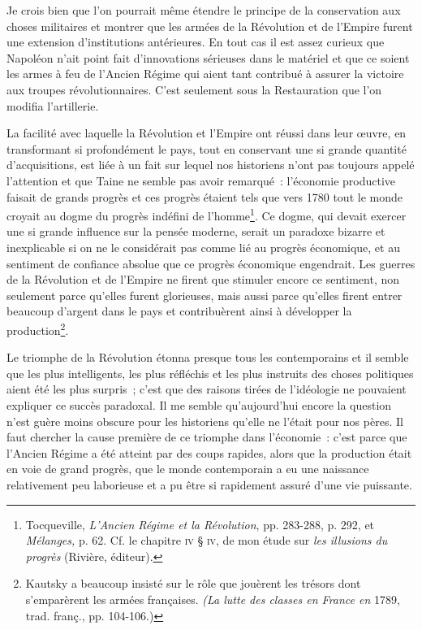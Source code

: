 \documentclass[french,twoside]{book} %
\begin{document}
 Je crois bien que l’on pourrait même étendre le principe de la conservation aux choses militaires et montrer que les armées de la Révolution et de l’Empire furent une extension d’institutions antérieures. En tout cas il est assez curieux que Napoléon n’ait point fait d’innovations sérieuses dans le matériel et que ce soient les armes à feu de l’Ancien Régime qui aient tant contribué à assurer la victoire aux troupes révolutionnaires. C’est seulement sous la Restauration que l’on modifia l’artillerie.\par
La facilité avec laquelle la Révolution et l’Empire ont réussi dans leur œuvre, en transformant si profondément le pays, tout en conservant une si grande quantité d’acquisitions, est liée à un fait sur lequel nos historiens n’ont pas toujours appelé l’attention et que Taine ne semble pas avoir remarqué : l’économie productive faisait de grands progrès et ces progrès étaient tels que vers 1780 tout le monde croyait au dogme du progrès indéfini de l’homme\footnote{ \noindent Tocqueville, \emph{L’Ancien Régime et la Révolution}, pp. 283-288, p. 292, et \emph{Mélanges,} p. 62. Cf. le chapitre {\scshape iv} § {\scshape iv}, de mon étude sur \emph{les illusions du progrès} (Rivière, éditeur).
 }. Ce dogme, qui devait exercer une si grande influence sur la pensée moderne, serait un paradoxe bizarre et inexplicable si on ne le considérait pas comme lié au progrès économique, et au sentiment de confiance absolue que ce progrès économique engendrait. Les guerres de la Révolution et de l’Empire ne firent que stimuler encore ce sentiment, non seulement parce qu’elles furent glorieuses, mais aussi parce qu’elles firent  entrer beaucoup d’argent dans le pays et contribuèrent ainsi à développer la production\footnote{ \noindent Kautsky a beaucoup insisté sur le rôle que jouèrent les trésors dont s’emparèrent les armées françaises. \emph{(La lutte des classes en France en} 1789, trad. franç., pp. 104-106.)
 }.\par
Le triomphe de la Révolution étonna presque tous les contemporains et il semble que les plus intelligents, les plus réfléchis et les plus instruits des choses politiques aient été les plus surpris ; c’est que des raisons tirées de l’idéologie ne pouvaient expliquer ce succès paradoxal. Il me semble qu’aujourd’hui encore la question n’est guère moins obscure pour les historiens qu’elle ne l’était pour nos pères. Il faut chercher la cause première de ce triomphe dans l’économie : c’est parce que l’Ancien Régime a été atteint par des coups rapides, alors que la production était en voie de grand progrès, que le monde contemporain a eu une naissance relativement peu laborieuse et a pu être si rapidement assuré d’une vie puissante.\par
\end{document}
